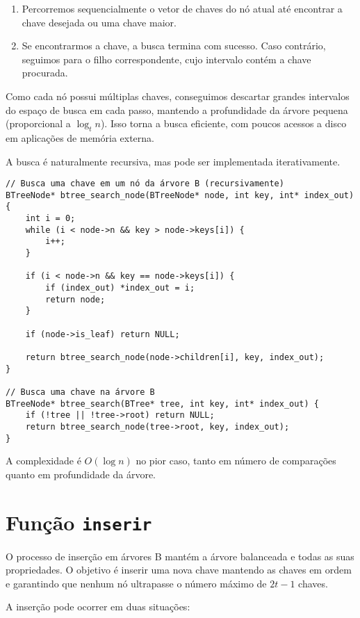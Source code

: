\begin{enumerate}
  \item Percorremos sequencialmente o vetor de chaves do nó atual até encontrar a chave desejada ou uma chave maior.
  \item Se encontrarmos a chave, a busca termina com sucesso. 
  Caso contrário, seguimos para o filho correspondente, cujo intervalo contém a chave procurada.
\end{enumerate}

Como cada nó possui múltiplas chaves, conseguimos descartar grandes intervalos do espaço de busca em cada passo, mantendo a profundidade da árvore pequena (proporcional a \( \log_t n \)). 
Isso torna a busca eficiente, com poucos acessos a disco em aplicações de memória externa.

A busca é naturalmente recursiva, mas pode ser implementada iterativamente. 

\begin{lstlisting}
// Busca uma chave em um nó da árvore B (recursivamente)
BTreeNode* btree_search_node(BTreeNode* node, int key, int* index_out) {
    int i = 0;
    while (i < node->n && key > node->keys[i]) {
        i++;
    }

    if (i < node->n && key == node->keys[i]) {
        if (index_out) *index_out = i;
        return node;
    }

    if (node->is_leaf) return NULL;

    return btree_search_node(node->children[i], key, index_out);
}

// Busca uma chave na árvore B
BTreeNode* btree_search(BTree* tree, int key, int* index_out) {
    if (!tree || !tree->root) return NULL;
    return btree_search_node(tree->root, key, index_out);
}
\end{lstlisting}


A complexidade é \( O(\log n) \) no pior caso, tanto em número de comparações quanto em profundidade da árvore.

\section{Função {\tt inserir}}

O processo de inserção em árvores B mantém a árvore balanceada e todas as suas propriedades. 
O objetivo é inserir uma nova chave mantendo as chaves em ordem e garantindo que nenhum nó ultrapasse o número máximo de \( 2t - 1 \) chaves.

A inserção pode ocorrer em duas situações:

